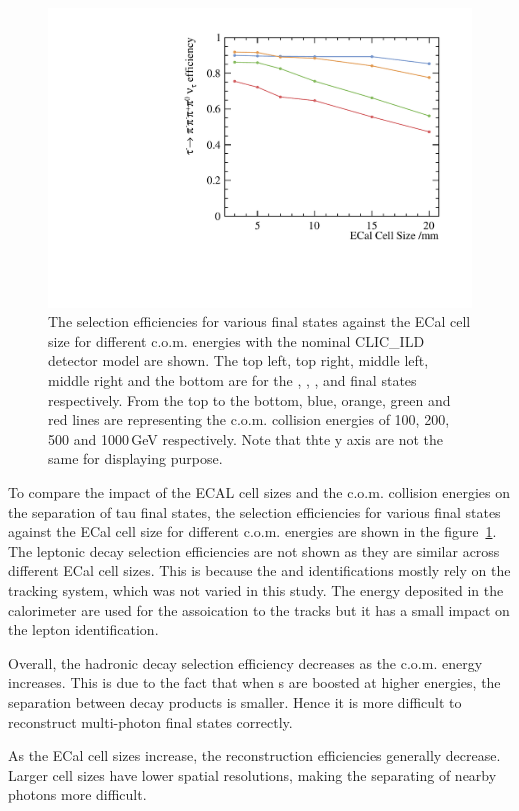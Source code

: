 \documentclass[a4paper,11pt]{article}
\begin{document}
\begin{figure}[htbp]
\qquad
\includegraphics[width=.45\textwidth]{plots/decayMode6}
\caption{\label{fig:pion_efficiency} The selection efficiencies for various final states against the ECal cell size for different c.o.m. energies with the nominal CLIC\_ILD detector model are shown. The top left, top right, middle left, middle right and the bottom are for the \Ppiminus\Pnut, \Pphoton\Pnut,  \Pphoton\Pnut, \Ppiminus\Pnut  and \Pphoton\Pnut  final states respectively. From the top to the bottom, blue, orange, green and red lines are representing the c.o.m. \Pelectron\APelectron collision energies of 100, 200, 500 and 1000\,GeV respectively. Note that thte y axis are not the same for displaying purpose.}
\end{figure}

To compare the impact of the ECAL cell sizes and the c.o.m. \Pelectron\APelectron collision energies on the separation of tau final states, the selection efficiencies for various final states against the ECal cell size for different c.o.m. energies are shown in the figure~\ref{fig:pion_efficiency}. The leptonic decay selection efficiencies are not shown as they are similar across different ECal cell sizes. This is because the \Pe and \Pmu identifications mostly rely on the tracking system, which was not varied in this study. The energy deposited in the calorimeter are used for the assoication to the tracks but it has a small impact on the lepton identification. 

Overall, the hadronic decay selection efficiency decreases as the c.o.m. energy increases. This is due to the fact that when {\Ptau}s are boosted at higher energies, the separation between decay products is smaller. Hence it is more difficult to reconstruct multi-photon final states correctly.

As the ECal cell sizes increase, the reconstruction efficiencies generally decrease. Larger cell sizes have lower spatial resolutions, making the separating of nearby photons more difficult.
\end{document}
